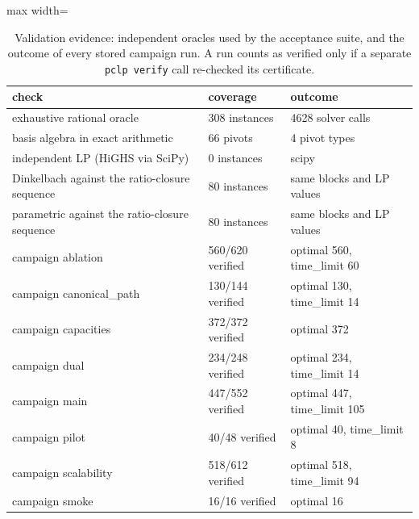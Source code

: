 \begin{table}[tbp]
\centering
\caption{Validation evidence: independent oracles used by the acceptance suite, and the outcome of every stored campaign run. A run counts as verified only if a separate \texttt{pclp verify} call re-checked its certificate.}
\label{tab:validation}
\small
\begin{adjustbox}{max width=\textwidth}
\begin{tabular}{lll}
\toprule
check & coverage & outcome \\
\midrule
exhaustive rational oracle & 308 instances & 4628 solver calls \\
basis algebra in exact arithmetic & 66 pivots & 4 pivot types \\
independent LP (HiGHS via SciPy) & 0 instances & scipy  \\
Dinkelbach against the ratio-closure sequence & 80 instances & same blocks and LP values \\
parametric against the ratio-closure sequence & 80 instances & same blocks and LP values \\
campaign ablation & 560/620 verified & optimal 560, time\_limit 60 \\
campaign canonical\_path & 130/144 verified & optimal 130, time\_limit 14 \\
campaign capacities & 372/372 verified & optimal 372 \\
campaign dual & 234/248 verified & optimal 234, time\_limit 14 \\
campaign main & 447/552 verified & optimal 447, time\_limit 105 \\
campaign pilot & 40/48 verified & optimal 40, time\_limit 8 \\
campaign scalability & 518/612 verified & optimal 518, time\_limit 94 \\
campaign smoke & 16/16 verified & optimal 16 \\
\bottomrule
\end{tabular}
\end{adjustbox}
\end{table}
